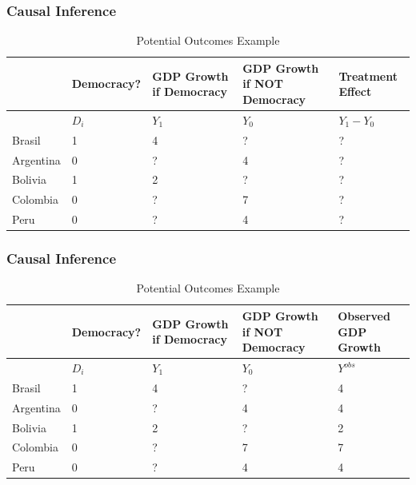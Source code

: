 \documentclass[xcolor=x11names,compress]{beamer}\usepackage[]{graphicx}\usepackage[]{color}
\renewcommand{\(}{\begin{columns}}
\renewcommand{\)}{\end{columns}}
\newcommand{\<}[1]{\begin{column}{#1}}
\renewcommand{\>}{\end{column}}
\begin{document}
\begin{frame}
\frametitle{Causal Inference}
\footnotesize
\begin{table}[htbp]
  \centering
  \caption{Potential Outcomes Example}
    \begin{tabular}{|p{1.8cm}|p{1.8cm}|p{2cm}|p{2cm}|p{2cm}|}
    \hline
          & \multicolumn{1}{p{1.8cm}|}{Democracy?} & \multicolumn{1}{p{2cm}|}{GDP Growth if Democracy} & \multicolumn{1}{p{2.2cm}|}{GDP Growth if NOT Democracy} & Treatment Effect \bigstrut\\
    \hline
          & \multicolumn{1}{p{1.8cm}|}{$D_i$} & \multicolumn{1}{p{2cm}|}{$Y_1$} & \multicolumn{1}{p{2.2cm}|}{$Y_0$} & \multicolumn{1}{p{1.8cm}|}{$Y_{1} - Y_{0}$} \bigstrut\\
    \hline
    Brasil & 1 & 4     & ?      & ? \bigstrut\\
    \hline
    Argentina & 0 & ?    & 4      & ? \bigstrut\\
    \hline
    Bolivia & 1 & 2     & ?     & ? \bigstrut\\
    \hline
    Colombia & 0 &  ?   & 7    & ? \bigstrut\\
    \hline
    Peru & 0 & ?     & 4     & ? \bigstrut\\
\hline
    \end{tabular}%
  \label{tab:addlabel}%
\end{table}%
\normalsize
\end{frame}

\begin{frame}
\frametitle{Causal Inference}
\footnotesize
\begin{table}[htbp]
  \centering
  \caption{Potential Outcomes Example}
    \begin{tabular}{|p{1.8cm}|p{1.8cm}|p{2cm}|p{2cm}|p{2cm}|}
    \hline
          & \multicolumn{1}{p{1.8cm}|}{Democracy?} & \multicolumn{1}{p{2cm}|}{GDP Growth if Democracy} & \multicolumn{1}{p{2.2cm}|}{GDP Growth if NOT Democracy} & \textbf{Observed} GDP Growth \bigstrut\\
    \hline
          & \multicolumn{1}{p{1.8cm}|}{$D_i$} & \multicolumn{1}{p{2cm}|}{$Y_1$} & \multicolumn{1}{p{2.2cm}|}{$Y_0$} & \multicolumn{1}{p{1.8cm}|}{$Y^{obs}$} \bigstrut\\
    \hline
    Brasil & 1 & 4     & ?      & 4 \bigstrut\\
    \hline
    Argentina & 0 & ?    & 4      & 4 \bigstrut\\
    \hline
    Bolivia & 1 & 2     & ?     & 2 \bigstrut\\
    \hline
    Colombia & 0 &  ?   & 7    & 7 \bigstrut\\
    \hline
    Peru & 0 & ?     & 4     & 4 \bigstrut\\
    \hline
    \end{tabular}%
  \label{tab:addlabel}%
\end{table}%
\normalsize
\end{frame}
\end{document}
